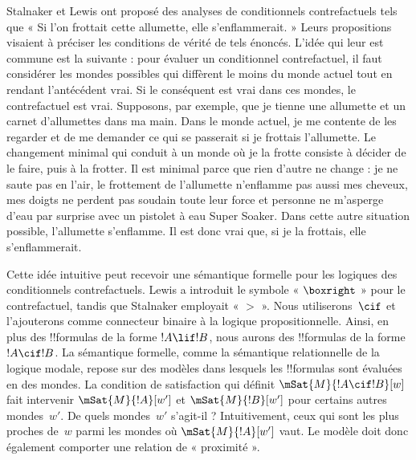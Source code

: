 \documentclass[../../../include/open-logic-section]{subfiles}
\begin{document}


Stalnaker et Lewis ont proposé des analyses de conditionnels
contrefactuels tels que « Si l'on frottait cette allumette, elle
s'enflammerait. » Leurs propositions visaient à préciser les
conditions de vérité de tels énoncés. L'idée qui leur est commune est
la suivante : pour évaluer un conditionnel contrefactuel, il faut
considérer les mondes possibles qui diffèrent le moins du monde actuel
tout en rendant l'antécédent vrai. Si le conséquent est vrai dans ces
mondes, le contrefactuel est vrai. Supposons, par exemple, que je
tienne une allumette et un carnet d'allumettes dans ma main. Dans le
monde actuel, je me contente de les regarder et de me demander ce
qui se passerait si je frottais l'allumette. Le changement minimal qui
conduit à un monde où je la frotte consiste à décider de le faire,
puis à la frotter. Il est minimal parce que rien d'autre ne change :
je ne saute pas en l'air, le frottement de l'allumette n'enflamme pas
aussi mes cheveux, mes doigts ne perdent pas soudain toute leur force
et personne ne m'asperge d'eau par surprise avec un pistolet à eau
Super Soaker. Dans cette autre situation possible, l'allumette
s'enflamme. Il est donc vrai que, si je la frottais, elle
s'enflammerait.

Cette idée intuitive peut recevoir une sémantique formelle pour les
logiques des conditionnels contrefactuels. Lewis a introduit le
symbole « $\boxright$ » pour le contrefactuel, tandis que Stalnaker
employait « $>$ ». Nous utiliserons~$\cif$ et l'ajouterons comme
connecteur binaire à la logique propositionnelle. Ainsi, en plus des
!!{formula}s de la forme $!A \lif !B$, nous aurons des !!{formula}s
de la forme~$!A \cif !B$. La sémantique formelle, comme la sémantique
relationnelle de la logique modale, repose sur des modèles dans
lesquels les !!{formula}s sont évaluées en des mondes. La condition
de satisfaction qui définit $\mSat{M}{!A \cif !B}[w]$ fait
intervenir $\mSat{M}{!A}[w']$ et $\mSat{M}{!B}[w']$ pour certains
autres mondes~$w'$. De quels mondes~$w'$ s'agit-il ? Intuitivement,
ceux qui sont les plus proches de~$w$ parmi les mondes où
$\mSat{M}{!A}[w']$ vaut. Le modèle
doit donc également comporter une relation de « proximité ».
\end{document}
